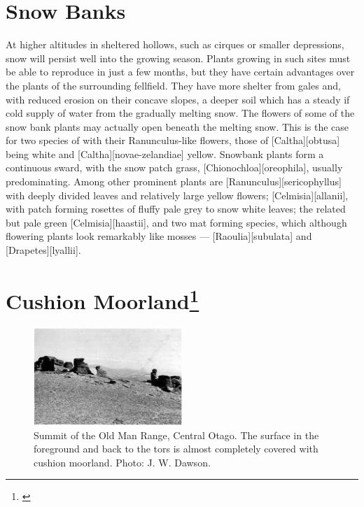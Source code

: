 \section{Snow Banks}

At higher altitudes in sheltered hollows, such as cirques or smaller depressions, snow will persist well into the growing season.
Plants growing in such sites must be able to reproduce in just a few months, but they have certain advantages over the plants of the surrounding fellfield.
They have more shelter from gales and, with reduced erosion on their concave slopes, a deeper soil which has a steady if cold supply of water from the gradually melting snow.
The flowers of some of the snow bank plants may actually open beneath the melting snow.
This is the case for two species of  with their Ranunculus-like flowers, those of [Caltha][obtusa]  being white and [Caltha][novae-zelandiae] yellow.
Snowbank plants form a continuous sward, with the snow patch grass, [Chionochloa][oreophila], usually predominating.
Among other prominent plants are [Ranunculus][sericophyllus] with deeply divided leaves and relatively large yellow flowers; [Celmisia][allanii], with patch forming rosettes of fluffy pale grey to snow white leaves; the related but pale green [Celmisia][haastii], and two mat forming species, which although flowering plants look remarkably like mosses --- [Raoulia][subulata] and [Drapetes][lyallii].

\section[Cushion Moorland]{Cushion Moorland\footnote{\cite{mark1970high}}}

\begin{figure}
	\includegraphics[width=0.5\textwidth]{graphics/figure113summit.jpg}
	\centering
	\caption[Summit of the Old Man Range]{Summit of the Old Man Range, Central Otago.
	The surface in the foreground and back to the tors is almost completely covered with cushion moorland.
	Photo: J. W. Dawson.}%
	\label{fig:113summit}
\end{figure}

